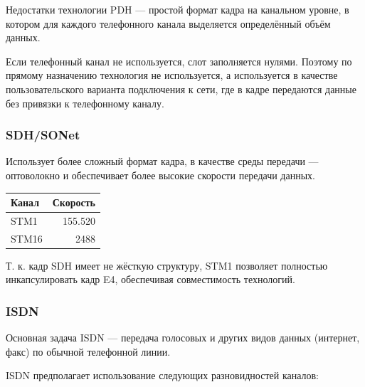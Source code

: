 \documentclass[12pt, russian, oneside, article]{ncc}
\begin{document}
Недостатки технологии PDH --- простой формат кадра на канальном уровне, в котором для каждого телефонного канала выделяется определённый объём данных.

Если телефонный канал не используется, слот заполняется нулями.
Поэтому по прямому назначению технология не используется, а используется в качестве пользовательского варианта подключения к сети, где в кадре передаются данные без привязки к телефонному каналу.
\subsubsection{SDH/SONet}
\label{sec-5_2_8}


Использует более сложный формат кадра, в качестве среды передачи --- оптоволокно и обеспечивает более высокие скорости передачи данных.


\begin{center}
\begin{tabular}{lr}
 Канал  &  Скорость  \\
\hline
 STM1   &   155.520  \\
 STM16  &      2488  \\
\end{tabular}
\end{center}



Т. к. кадр SDH имеет не жёсткую структуру, STM1 позволяет полностью инкапсулировать кадр E4, обеспечивая совместимость технологий.
\subsubsection{ISDN}
\label{sec-5_2_9}


Основная задача ISDN --- передача голосовых и других видов данных (интернет, факс) по обычной телефонной линии.

ISDN предполагает использование следующих разновидностей каналов:
\end{document}
